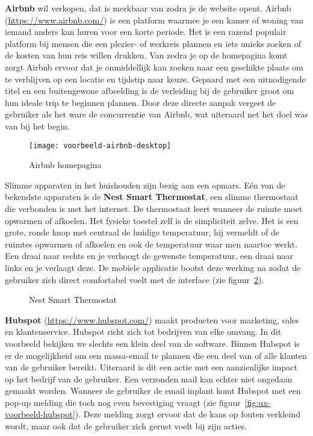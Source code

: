 \textbf{Airbnb} wil verkopen, dat is merkbaar van zodra je de website opent. Airbnb (\url{https://www.airbnb.com/}) is een platform waarmee je een kamer of woning van iemand anders kan huren voor een korte periode. Het is een razend populair platform bij mensen die een plezier- of werkreis plannen en iets unieks zoeken of de kosten van hun reis willen drukken. Van zodra je op de homepagina komt zorgt Airbnb ervoor dat je onmiddellijk kan zoeken naar een geschikte plaats om te verblijven op een locatie en tijdstip naar keuze. Gepaard met een uitnodigende titel en een buitengewone afbeelding is de verleiding bij de gebruiker groot om hun ideale trip te beginnen plannen. Door deze directe aanpak vergeet de gebruiker als het ware de concurrentie van Airbnb, wat uiteraard net het doel was van bij het begin.

\begin{figure}
    \centering
    \texttt{[image: voorbeeld-airbnb-desktop]}
    \caption{Airbnb homepagina}
    \label{fig:ux-voorbeeld-airbnb}
\end{figure}

Slimme apparaten in het huishouden zijn bezig aan een opmars. Eén van de bekendste apparaten is de \textbf{Nest Smart Thermostat}, een slimme thermostaat die verbonden is met het internet. De thermostaat leert wanneer de ruimte moet opwarmen of afkoelen. Het fysieke toestel zelf is de simpliciteit zelve. Het is een grote, ronde knop met centraal de huidige temperatuur, hij vermeldt of de ruimtes opwarmen of afkoelen en ook de temperatuur waar men naartoe werkt. Een draai naar rechts en je verhoogt de gewenste temperatuur, een draai naar links en je verlaagt deze. De mobiele applicatie bootst deze werking na zodat de gebruiker zich direct comfortabel voelt met de interface (zie figuur~\ref{fig:ux-voorbeeld-nest}).

\begin{figure}
    \centering
    \qquad
    \caption{Nest Smart Thermostat}
    \label{fig:ux-voorbeeld-nest}
\end{figure}

\textbf{Hubspot} (\url{https://www.hubspot.com/}) maakt producten voor marketing, sales en klantenservice. Hubspot richt zich tot bedrijven van elke omvang. In dit voorbeeld bekijken we slechts een klein deel van de software. Binnen Hubspot is er de mogelijkheid om een massa-email te plannen die een deel van of alle klanten van de gebruiker bereikt. Uiteraard is dit een actie met een aanzienlijke impact op het bedrijf van de gebruiker. Een verzonden mail kan echter niet ongedaan gemaakt worden. Wanneer de gebruiker de email inplant komt Hubspot met een pop-up melding die toch nog even bevestiging vraagt (zie figuur~\ref{fig:ux-voorbeeld-hubspot}). Deze melding zorgt ervoor dat de kans op fouten verkleind wordt, maar ook dat de gebruiker zich gerust voelt bij zijn acties.

